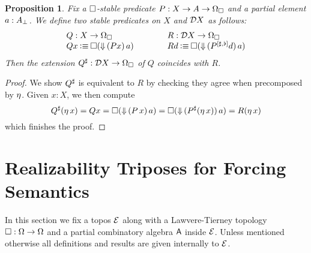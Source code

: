 \documentclass[11pt]{article}
\newtheorem{prop}[thrm]{Proposition}
\begin{document}
\begin{prop}\label{prop:boxed-existential-partial-extension}
  Fix a \(\Box\)-stable predicate \(P : X \to A \to \Omega_\Box\)
  and a partial element \(a : {A}_\bot\).
  We define two stable predicates on \(X\) and \(\mathcal{D}{X}\) as follows:
  \[\arraycolsep=2em
    \begin{array}{ll}
      Q:\IFun{X}{\IPropCl}
      &
        R:\IFun{\ISheaf{X}}{\IPropCl}
      \\
      {Qx} \IsDefined {\IBox{(\IParEExt{(Px)}\,a)}}
      &
        {Rd} \IsDefined {\IBox{(\IParEExt{(\IRPExt{P}d)}\,a)}}
    \end{array}
  \]
  Then the extension \({Q}^\sharp:{{\mathcal{D}{X}}\to{\Omega_\Box}}\) of \(Q\)
  coincides with \(R\).
\end{prop}
\begin{proof}
  We show \({Q}^\sharp\) is equivalent to \(R\) by checking they agree
  when precomposed by \(\eta\).
  Given \(x : X\), we then compute
  \[
    {Q}^\sharp(\eta\,{x})
    = Qx
    = \Box{({\Downarrow}\,{(P\,x)}\,a)}
    = \Box{({\Downarrow}\,{({P}^\sharp(\eta\,{x}))}\,a)}
    = R(\eta\,{x})
  \]
  which finishes the proof.
\end{proof}

\newpage

\section{Realizability Triposes for Forcing Semantics}

In this section we fix a topos \(\mathcal{E}\) along with a Lawvere-Tierney
topology \(\Box : \Omega \to \Omega\) and a partial combinatory
algebra \(\mathsf{A}\) inside \(\mathcal{E}\).
%
Unless mentioned otherwise all definitions and results are given
internally to \(\mathcal{E}\).
\end{document}

